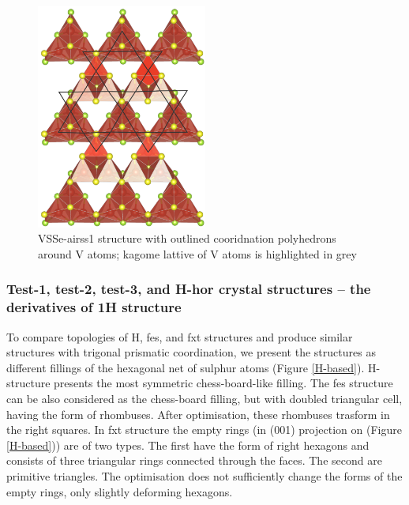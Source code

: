 \documentclass[a4paperm]{article}
\begin{document}
\begin{figure}[H]
        \includegraphics[width=0.5\textwidth]{airss1_v_poly.png}
        \caption{VSSe-airss1 structure with outlined cooridnation polyhedrons around V atoms; kagome lattive of V atoms is highlighted in grey}
\label{airss1_poly}
\end{figure}


\subsubsection{Test-1, test-2, test-3, and H-hor crystal structures – the derivatives of 1H structure}

To compare topologies of H, fes, and fxt structures and produce similar structures with trigonal prismatic coordination, we present the structures as different fillings of the hexagonal net of sulphur atoms (Figure \ref{H-based}).
H-structure presents the most symmetric chess-board-like filling.
The fes structure can be also considered as the chess-board filling, but with doubled triangular cell, having the form of rhombuses.
After optimisation, these rhombuses trasform in the right squares.
In fxt structure the empty rings (in (001) projection on  (Figure \ref{H-based})) are of two types.
The first have the form of right hexagons and consists of three triangular rings connected through the faces.
The second are primitive triangles.
The optimisation does not sufficiently change the forms of the empty rings, only slightly deforming hexagons.
\end{document}
